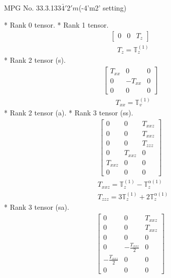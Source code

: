 \documentclass[fleqn,8pt,landscape]{jsarticle}
\begin{document}
\setcounter{MaxMatrixCols}{32}

\renewcommand{\tablename}{Table~}
\renewcommand{\figurename}{Figure~}
\begin{center}
\LARGE
MPG No. 33.3.133\quad$\bar{4}'2'm$\quad(-4'm2' setting)
\end{center}
* Rank 0 tensor.
* Rank 1 tensor.
\begin{align*}
\begin{bmatrix} 0 & 0 & T_{z} \end{bmatrix}
\end{align*}
\begin{align*}
& T_{z} = \mathbb{T}_{z}^{(1)}
\end{align*}
* Rank 2 tensor (s).
\begin{align*}
\begin{bmatrix} T_{xx} & 0 & 0 \\ 0 & - T_{xx} & 0 \\ 0 & 0 & 0 \end{bmatrix}
\end{align*}
\begin{align*}
& T_{xx} = \mathbb{T}_{v}^{(1)}
\end{align*}
* Rank 2 tensor (a).
* Rank 3 tensor (ss).
\begin{align*}
\begin{bmatrix} 0 & 0 & T_{xxz} \\ 0 & 0 & T_{xxz} \\ 0 & 0 & T_{zzz} \\ 0 & T_{xxz} & 0 \\ T_{xxz} & 0 & 0 \\ 0 & 0 & 0 \end{bmatrix}
\end{align*}
\begin{align*}
& T_{xxz} = \mathbb{T}_{z}^{(1)} - \mathbb{T}_{z}^{\alpha(1)} \\
& T_{zzz} = 3 \mathbb{T}_{z}^{(1)} + 2 \mathbb{T}_{z}^{\alpha(1)}
\end{align*}
* Rank 3 tensor (sa).
\begin{align*}
\begin{bmatrix} 0 & 0 & T_{xxz} \\ 0 & 0 & T_{xxz} \\ 0 & 0 & 0 \\ 0 & - \frac{T_{xxz}}{2} & 0 \\ - \frac{T_{xxz}}{2} & 0 & 0 \\ 0 & 0 & 0 \end{bmatrix}
\end{align*}
\end{document}
